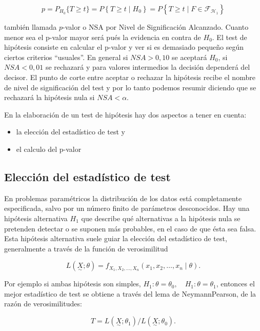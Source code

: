 \documentclass[
]{article}
\providecommand{\tightlist}{%
  \setlength{\itemsep}{0pt}\setlength{\parskip}{0pt}}
\begin{document}
\[
p=P_{H_{0}}\{T \geq t\}=P\left\{T \geq t \mid H_{0}\right\}=P\left\{T \geq t \mid F \in \mathcal{F}_{\mathcal{H}_{1}}\right\}
\]

también llamada \(p\)-valor o NSA por Nivel de Significación Alcanzado. Cuanto menor sea el p-valor mayor será pués la evidencia en contra de \(H_{0}\). El test de hipótesis consiste en calcular el p-valor y ver si es demasiado pequeño según ciertos criterios ``usuales''. En general si \(N S A>0,10\) se aceptará \(H_{0}\), si
\(N S A<0,01\) se rechazará y para valores intermedios la decisión dependerá del decisor. El punto de corte entre aceptar o rechazar la hipótesis recibe el nombre de nivel de significación del test y por lo tanto podemos resumir diciendo que se rechazará la hipótesis nula si \(N S A<\alpha\).

En la elaboración de un test de hipótesis hay dos aspectos a tener en cuenta:

\begin{itemize}
\tightlist
\item
  la elección del estadístico de test y
\item
  el calculo del p-valor
\end{itemize}

\subsection{Elección del estadístico de test}\label{elecciuxf3n-del-estaduxedstico-de-test}

En problemas paramétricos la distribución de los datos está completamente especificada, salvo por un número finito de parámetros desconocidos. Hay una hipótesis alternativa \(H_{1}\) que describe qué alternativas a la hipótesis nula se pretenden detectar o se suponen más probables, en el caso de que ésta sea falsa. Esta hipótesis alternativa suele guiar la elección del estadístico de test, generalmente a través de la función de verosimilitud

\[
L(\underset{\sim}{X} ; \theta)=f_{X_{1}, X_{2}, \ldots, X_{n}}\left(x_{1}, x_{2}, \ldots, x_{n} \mid \theta\right) .
\]

Por ejemplo si ambas hipótesis son simples, \(H_{1}: \theta=\theta_{0}, \quad H_{1}: \theta=\theta_{1}\), entonces el mejor estadístico de test se obtiene a través del lema de NeymannPearson, de la razón de verosimilitudes:

\[
T=L\left(\underset{\sim}{X} ; \theta_{1}\right) / L\left(\underset{\sim}{X} ; \theta_{0}\right) .
\]
\end{document}
